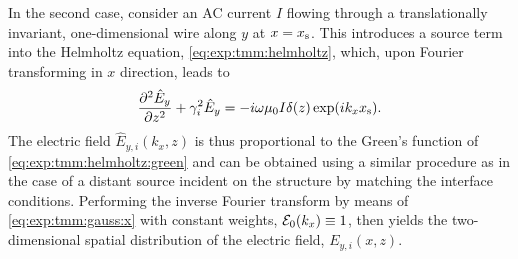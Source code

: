 In the second case, \citet{Langevin2024} consider an AC current $I$ flowing through a translationally invariant, one-dimensional wire along $y$ at $x=x_{\mathrm{s}}$.
This introduces a source term into the Helmholtz equation, \cref{eq:exp:tmm:helmholtz}, which, upon Fourier transforming in $x$ direction, leads to
\begin{equation}\label{eq:exp:tmm:helmholtz:green}
    \pdv[2]{\hat{E}_y}{z} + \gamma_i^2\hat{E}_y = -i\omega\mu_0 I\delta(z)\exp(i k_x x_{\mathrm{s}}).
\end{equation}
The electric field $\hat{E}_{y,i}(k_x, z)$ is thus proportional to the Green's function of \cref{eq:exp:tmm:helmholtz:green} and can be obtained using a similar procedure as in the case of a distant source incident on the structure by matching the interface conditions.
Performing the inverse Fourier transform by means of \cref{eq:exp:tmm:gauss:x} with constant weights, $\mathcal{E}_0(k_x)\equiv 1$, then yields the two-dimensional spatial distribution of the electric field, $E_{y,i}(x, z)$.

